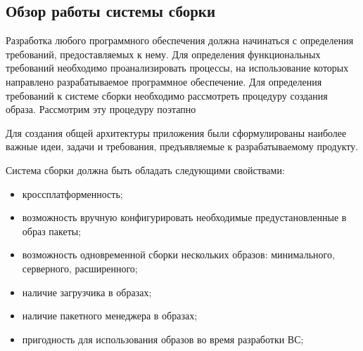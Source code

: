 \subsection{Обзор работы системы сборки}
\label{subsec:build-system-overview}
Разработка любого программного обеспечения должна начинаться с определения требований, предоставляемых к нему\cite{REQUIREMENTS}.
Для определения функциональных требований необходимо проанализировать процессы, на использование которых направлено разрабатываемое программное обеспечение.
Для определения требований к системе сборки необходимо рассмотреть процедуру создания образа. Рассмотрим эту процедуру поэтапно

Для создания общей архитектуры приложения были сформулированы наиболее важные идеи, задачи и требования, предъявляемые к разрабатываемому продукту.

\newpage
Система сборки должна быть обладать следующими свойствами:
\begin{itemize}
  \item кроссплатформенность;
  \item возможность вручную конфигурировать необходимые предустановленные в образ пакеты;
  \item возможность одновременной сборки нескольких образов: минимального, серверного, расширенного;
  \item наличие загрузчика в образах;
  \item наличие пакетного менеджера в образах;
  \item пригодность для использования образов во время разработки ВС;
\end{itemize}
\newpage
